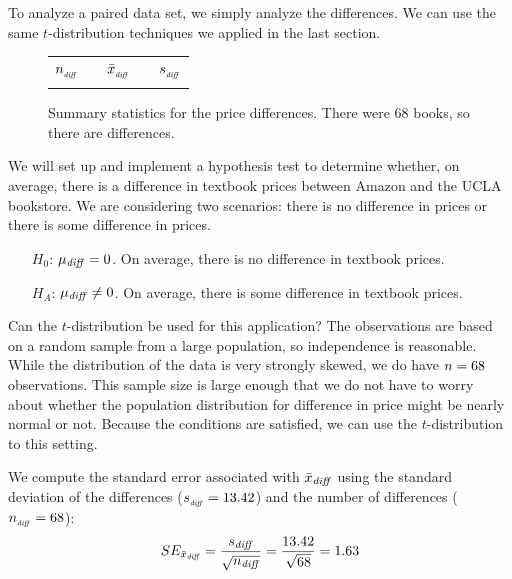 To analyze a paired data set,
we simply analyze the differences.
We can use the same $t$-distribution techniques
we applied in the last section.

\begin{figure}[hh]
\centering
\begin{tabular}{ccccc}
\hline
$n_{_{\text{\emph{diff}}}}$	&\hspace{3mm}& $\bar{x}_{_{\text{\emph{diff}}}}$	&\hspace{3mm}& $s_{_{\text{\emph{diff}}}}$ \vspace{1mm}\\
\uclabookN{}  && \uclabookM{}  && \uclabookSD{} \\
\hline
\end{tabular}
\caption{Summary statistics for the price differences.
    There were 68 books, so there are \uclabookN{}
    differences.}
\label{textbooksSummaryStats}
\end{figure}

\D{\newpage}

We will set up and implement a hypothesis test to determine whether, on average, there is a difference in textbook prices between Amazon and the UCLA bookstore.
\label{htForDiffInUCLAAndAmazonTextbookPrices}
We are considering two scenarios: there is no difference in prices or there is some difference in prices.
\begin{itemize}
\setlength{\itemsep}{0mm}
\item[$H_0$:] $\mu_{\text{\emph{diff}}}=0$. On average, there is no difference in textbook prices.
\item[$H_A$:] $\mu_{\text{\emph{diff}}} \neq 0$. On average, there is some difference in textbook prices.
\end{itemize}

Can the $t$-distribution be used for this application?
The observations are based on a random sample from a large population,
so independence is reasonable.
While the distribution of the data is very strongly skewed,
we do have $n = 68{}$ observations.  This sample size is large enough that we do not have to worry about whether the population distribution for difference in price might be nearly normal or not.
Because the conditions are satisfied,
we can use the $t$-distribution to this setting.

We compute the standard error associated with
$\bar{x}_{\text{\emph{diff}}}$ using the standard
deviation of the differences
($s_{_{\text{\emph{diff}}}} = 13.42{}$)
and the number of differences
($n_{_{\text{\emph{diff}}}} = 68{}$):
\begin{align*}
SE_{\bar{x}_{\text{\emph{diff}}}}
  = \frac{s_{\text{\emph{diff}}}}{\sqrt{n_{\text{\emph{diff}}}}}
  = \frac{13.42{}}{\sqrt{68{}}} = 1.63{}
\end{align*}

